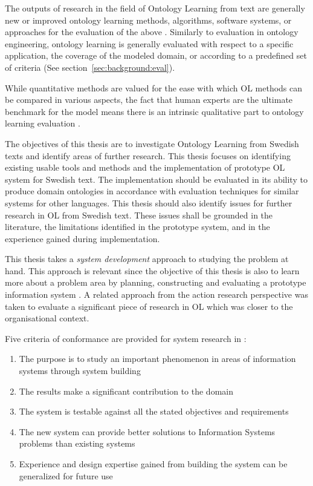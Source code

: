 \documentclass[a4paper]{report}
\newcommand{\todo}[1]{}
\begin{document}
The outputs of research in the field of Ontology Learning from text are generally new or improved ontology learning methods, algorithms, software systems, or approaches for the evaluation of the above \cite{Wong11Survey}.
Similarly to evaluation in ontology engineering, ontology learning is generally evaluated with respect to a specific application, the coverage of the modeled domain, or according to a predefined set of criteria\cite{Wong11Survey} (See section~\ref{sec:background:eval}).
\todo{perhaps expand on these. bring out the issue of mutliple corpora and gold standards and (un)generalizability (but evidence towards it)}
While quantitative methods are valued for the ease with which OL methods can be compared in various aspects, the fact that human experts are the ultimate benchmark for the model means there is an intrinsic qualitative part to ontology learning evaluation \todo{cite this synthesis/opinion/whatever}.

The objectives of this thesis are to investigate Ontology Learning from Swedish texts and identify areas of further research.
This thesis focuses on identifying existing usable tools and methods and the implementation of prototype OL system for Swedish text.
The implementation should be evaluated in its ability to produce domain ontologies in accordance with evaluation techniques for similar systems for other languages.
This thesis should also identify issues for further research in OL from Swedish text.
These issues shall be grounded in the literature, the limitations identified in the prototype system, and in the experience gained during implementation. \todo{this is still rather rough, isn't it?}

This thesis takes a \emph{system development} approach to studying the problem at hand.
This approach is relevant since the objective of this thesis is also to learn more about a problem area by planning, constructing and evaluating a prototype information system \cite{NunamakerChen90SDResearch}.
A related approach from the action research perspective\cite{BursteinGregor99SDResearch} was taken to evaluate a significant piece of research in OL which was closer to the organisational context\cite{Blomqvist09Thesis}.

Five criteria of conformance are provided for system research in \cite{NunamakerChen90SDResearch}:
\begin{enumerate}
\item The purpose is to study an important phenomenon in areas of information systems through
system building
\item The results make a significant contribution to the domain
\item The system is testable against all the stated objectives and requirements
\item The new system can provide better solutions to Information Systems problems than existing systems
\item Experience and design expertise gained from building the system can be generalized for future use
\end{enumerate}
\end{document}
